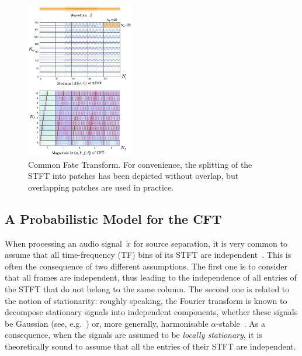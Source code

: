 \begin{figure}[t]
\centering
\includegraphics[width=0.9\columnwidth]{figures/CFT}

\caption{Common Fate Transform. For convenience, the splitting of the STFT
into patches has been depicted without overlap, but overlapping patches
are used in practice\label{fig:CFT}.}
\end{figure}

\subsection{A Probabilistic Model for the CFT}

\label{sub:separation}

When processing an audio signal~$\tilde{x}$ for source separation,
it is very common to assume that all time-frequency (TF) bins
of its STFT are independent~\cite{fevotte09,duong10,ozerov12,liutkus11t}.
This is often the consequence of two different assumptions.
The first one is to consider that all frames are independent, thus
leading to the independence of all entries of the STFT that do not belong to the
same column. The second one is related to the notion of stationarity:
roughly speaking, the Fourier transform is known to decompose stationary
signals into independent components, whether these signals be Gaussian
(see, e.g.~\cite{liutkus11t}) or, more generally, harmonisable $\alpha$-stable~\cite{liutkus15}.
As a consequence, when the signals are assumed to be \emph{locally stationary},
it is theoretically sound to assume that all the entries of
their STFT are independent.


